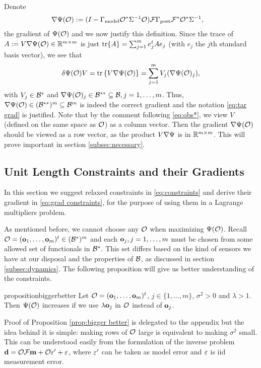 \documentclass{amsart}
\numberwithin{equation}{section}
\begin{document}
Denote
\begin{align}\label{eq:tar grad}
  \nabla \Psi(\mathcal{O}) &:= (I - \Gamma_{\textup{model}} \mathcal{O}^* \Sigma^{-1} \mathcal{O}) \mathcal{F}
  \Gamma_{\textup{post}} \mathcal{F}^* \mathcal{O}^*\Sigma^{-1},
\end{align}
the gradient of $\Psi (\mathcal{O} )$ and we now justify this definition.
Since the trace of $A := V \nabla \Psi(\mathcal{O}) \in \mathbb{R}^{m \times m}$ is
just $\textup{tr}\{A\} = \sum_{j=1}^m e_j^t A e_j$ (with $e_j$ the $j$th standard
basis vector), we see that
\begin{align*}
  \delta \Psi(\mathcal{O})V = \textup{tr}\left \{V \nabla \Psi(\mathcal{O}) \right \} = \sum_{j=1}^m
  V_j(\nabla \Psi(\mathcal{O})_j),
\end{align*}
with $V_j \in \mathcal{B}^*$ and $\nabla \Psi(\mathcal{O})_j \in \mathcal{B}^{**}\subseteq
\mathcal{B}, j=1,\dots,m$. Thus, $\nabla \Psi( \mathcal{O} ) \in (\mathcal{B}^{**})^m
\subseteq \mathcal{B}^m$ is indeed the correct gradient and the notation
\eqref{eq:tar grad} is justified. Note that by the comment following
\eqref{eq:obs*}, we view $V$ (defined on the same space as $\mathcal{O}$) as
a column vector. Then the gradient $\nabla \Psi(\mathcal{O})$ should be
viewed as a row vector, as the product $V \nabla \Psi$ is in $\mathbb{R}^{m
  \times m}$. This will prove important in section
\ref{subsec:necessary}.

\subsection{Unit Length Constraints and their Gradients}\label{subsec:unit length}
In this section we suggest relaxed constraints in
\eqref{eq:constraints} and derive their gradient in \eqref{eq:grad
  constraints}, for the purpose of using them in a Lagrange
multipliers problem.

As mentioned before, we cannot choose any $\mathcal{O}$ when maximizing
$\Psi(\mathcal{O})$. Recall $\mathcal{O} = (\mathbf{o}_1,\dots,\mathbf{o}_m)^t \in (\mathcal{B}^*)^m$
and each $\mathbf{o}_j,j=1,\dots,m$ must be chosen from some allowed set of
functionals in $\mathcal{B}^*$. This set differs based on the kind of sensors
we have at our disposal and the properties of $\mathcal{B}$, as discussed in
section \ref{subsec:dynamics}. The following proposition will give us
better understanding of the constraints. 
\begin{restatable*}{proposition}{biggerbetter}\label{prop:bigger better}
  Let $\mathcal{O} = (\mathbf{o}_1,\dots,\mathbf{o}_m)^t$, $j \in \{1,\dots,m\}$, $\sigma^2
  > 0$ and $\lambda > 1$. Then $\Psi(\mathcal{O})$ increases if we use
  $\lambda \mathbf{o}_j$ in $\mathcal{O}$ instead of $\mathbf{o}_j$.
\end{restatable*}
Proof of Proposition \ref{prop:bigger better} is delegated to the
appendix but the idea behind it is simple: making rows of $\mathcal{O}$ large
is equivalent to making $\sigma^2$ small. This can be understood
easily from the formulation of the inverse problem $\mathbf{d} = \mathcal{O} \mathcal{F}
\mathbf{m} + \mathcal{O} \varepsilon' + \varepsilon$, where $\varepsilon'$ can be taken as model error
and $\varepsilon$ is iid measurement error.
\end{document}
